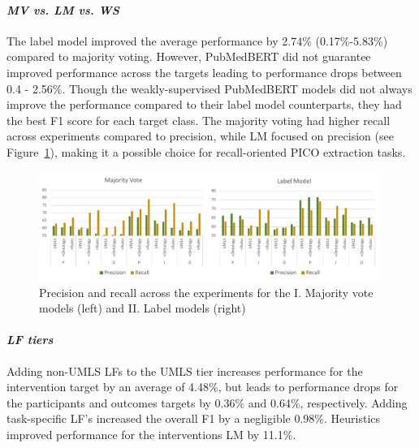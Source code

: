 \documentclass[10.7pt,]{article}
\let\oldparagraph\paragraph
\renewcommand{\paragraph}[1]{\oldparagraph{#1}\mbox{}}
\begin{document}
\paragraph{\textit{MV vs. LM vs. WS}}
The label model improved the average performance by 2.74\% (0.17\%-5.83\%) compared to majority voting.
However, PubMedBERT did not guarantee improved performance across the targets leading to performance drops between 0.4 - 2.56\%.
Though the weakly-supervised PubMedBERT models did not always improve the performance compared to their label model counterparts, they had the best F1 score for each target class.
The majority voting had higher recall across experiments compared to precision, while LM focused on precision (see Figure~\ref{fig:precRecall}), making it a possible choice for recall-oriented PICO extraction tasks.
%
\begin{figure}
    \centering
    \includegraphics[width=0.99\textwidth]{figures/precRecall.pdf}
    \caption{Precision and recall across the experiments for the I. Majority vote models (left) and II. Label models (right)}
    \label{fig:precRecall}
\end{figure}
%
\paragraph{\textit{LF tiers}}
Adding non-UMLS LFs to the UMLS tier increases performance for the intervention target by an average of 4.48\%, but leads to performance drops for the participants and outcomes targets by 0.36\% and 0.64\%, respectively.
Adding task-specific LF's increased the overall F1 by a negligible 0.98\%.
Heuristics improved performance for the interventions LM by 11.1\%.
%
\end{document}

